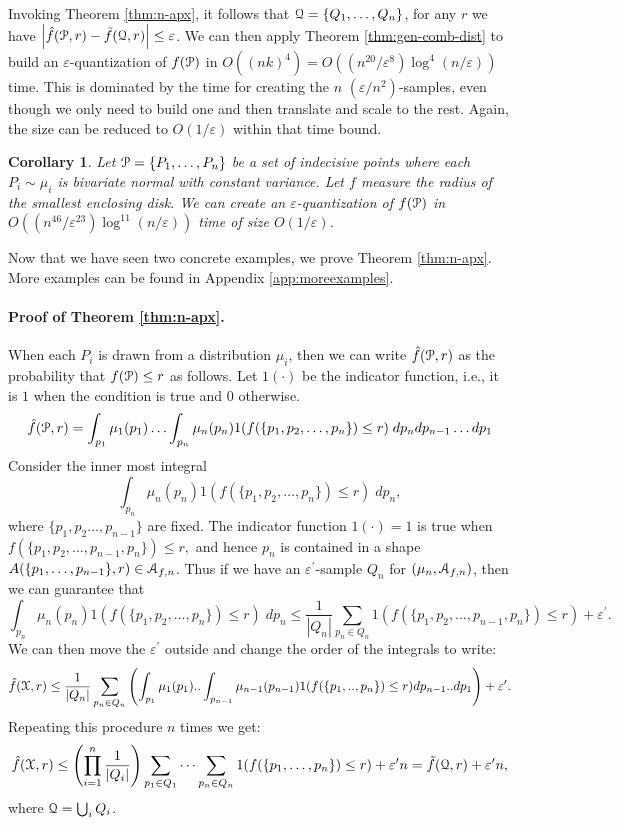 \documentclass{journal}
\newcommand{\eps}{\varepsilon}
\newcommand{\Eu}[1]{\ensuremath{\EuScript{#1}}}
\newtheorem {corollary}[theorem]{Corollary}
\begin{document}
Invoking Theorem \ref{thm:n-apx}, it follows that $\Eu Q = \{Q_1, \ldots, Q_n\}$, for any $r$ we have $\left| \hat f(\Eu P, r) - \tilde f(\Eu Q, r) \right| \leq \eps$.   We can then apply Theorem \ref{thm:gen-comb-dist} to build an $\eps$-quantization of $f(\Eu P)$ in $O((nk)^4) = O((n^{20}/\eps^{8}) \log^4 (n/\eps))$ time.   This is dominated by the time for creating the $n$ $(\eps/n^2)$-samples, even though we only need to build one and then translate and scale to the rest.  
Again, the size can be reduced to $O(1/\eps)$ within that time bound.  

\begin{corollary}
Let $\Eu P = \{P_1, \ldots, P_n\}$ be a set of indecisive points where each $P_i \sim \mu_i$ is bivariate normal with constant variance.  Let $f$ measure the radius of the smallest enclosing disk.
We can create an $\eps$-quantization of $f(\Eu P)$ in $O((n^{46}/\eps^{23}) \log^{11} (n/\eps))$ time  of size $O(1/\eps)$.
\label{cor:n-apx-seb2}
\end{corollary}


Now that we have seen two concrete examples, we prove Theorem \ref{thm:n-apx}. More examples can be found in Appendix \ref {app:moreexamples}.

\paragraph{Proof of Theorem \ref{thm:n-apx}.}


When each $P_i$ is drawn from a distribution $\mu_i$, then we can write $\hat f(\Eu P, r)$ as the probability that $f(\Eu P) \leq r$ as follows.  Let $1(\cdot)$ be the indicator function, i.e., it is $1$ when the condition is true and $0$ otherwise.
\[
\hat f(\Eu P, r) =
\int_{p_1} \mu_1(p_1) \ldots \int_{p_n} \mu_n(p_n)
1(f(\{p_1, p_2, \ldots, p_n\}) \leq r) \;
d p_n d p_{n-1} \ldots d p_1
\]
Consider the inner most integral
\[
\int_{p_n} \mu_n(p_n)  1(f(\{p_1, p_2, \ldots, p_n\}) \leq r) \; d p_n,
\]
where $\{p_1, p_2 \ldots, p_{n-1}\}$ are fixed.  The indicator function $1(\cdot) = 1$ is true 
when
$
f(\{p_1, p_2, \ldots, p_{n-1}, p_n\}) \leq r,
$
and hence $p_n$ is contained in a shape $A(\{p_1, \ldots, p_{n-1}\}, r) \in \Eu{A}_{f,n}$.
Thus if we have an $\eps^\prime$-sample $Q_n$ for $(\mu_n,\Eu{A}_{f,n})$, then we can guarantee that
\[
\int_{p_n}  \mu_{n}(p_n)  1(f(\{p_1, p_2, \ldots, p_n\}) \leq r) \; d p_n
\leq
\frac{1}{|Q_n|} \sum_{p_n \in Q_{n}} 1(f(\{p_1, p_2, \ldots, p_{n-1}, p_n\}) \leq r) + \eps^\prime.
\]
We can then move the $\eps^\prime$ outside and change the order of the integrals to write:
\[
\hat f(\Eu X, r) \leq  \frac{1}{|Q_n|} \sum_{p_n \in Q_{n}} 
\left( \int_{p_1}  \mu_1(p_1) ..  \int_{p_{n-1}}  \mu_{n-1}(p_{n-1})
1(f(\{p_1,.., p_n\}) \leq r) 
d p_{n-1} .. d {p_1}\right)  +  \eps^\prime.
\]
Repeating this procedure $n$ times we get:
\[
\hat f(\Eu X, r)
\leq
\left(\prod_{i=1}^n \frac{1}{|Q_i|}\right)
 \sum_{p_1 \in Q_1}  \dots \sum_{p_n \in Q_n}
1(f(\{p_1, \ldots, p_n\}) \leq r)
+ \eps^\prime n
 =
\tilde{f}(\Eu Q,r) + \eps^\prime n,
\]
where $\Eu Q = \bigcup_i Q_i$.
\end{document}

